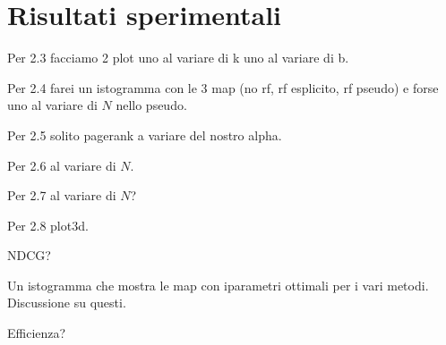 \section{Risultati sperimentali}
\label{sec:risult-sper}

Per 2.3 facciamo 2 plot uno al variare di k uno al variare di b.

Per 2.4 farei un istogramma con le 3 map (no rf, rf esplicito, rf pseudo) e forse uno al variare di $N$ nello pseudo.

Per 2.5 solito pagerank a variare del nostro alpha.

Per 2.6 al variare di $N$.

Per 2.7 al variare di $N$?

Per 2.8 plot3d.

NDCG?

Un istogramma che mostra le map con iparametri ottimali per i vari metodi. Discussione su questi.

Efficienza?

%
%
%

